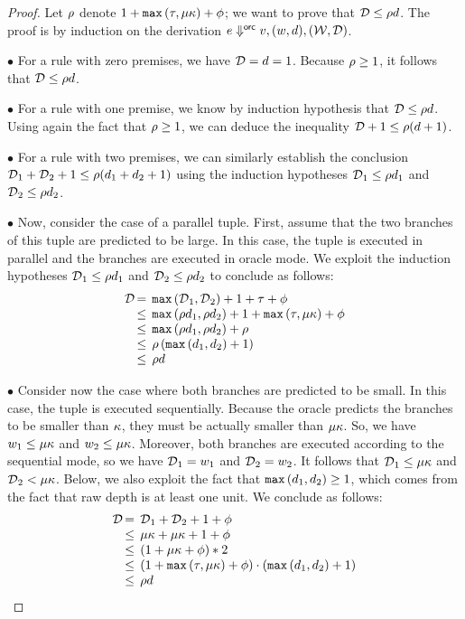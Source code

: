 \begin{proof}


Let $\rho{}$ denote
$1+{\mathtt{{max}}}\left({\tau},{\mu}{\kappa}\right)+{\phi}$; we want to  prove that ${\mathcal{D}} \leq
\rho{}d$.  The proof is by induction on the derivation 
${ e } \Downarrow^{\textsf{orc}} {v}, ({w},{d}), ({{\mathcal{W}}},{{\mathcal{D}}})$.

$\bullet$  For a rule with zero premises, we have ${\mathcal{D}} = d = 1$.
Because $\rho{} \geq 1$, it follows that ${\mathcal{D}} \leq \rho{}d$.

$\bullet$  For a rule with one premise, we know by induction hypothesis that
${\mathcal{D}} \leq \rho{}d$.
Using again the fact that $\rho{} \geq 1$, 
we can deduce the inequality ${\mathcal{D}}+1 \leq \rho{}(d+1)$.

$\bullet$ For a rule with two premises, we can similarly establish
the conclusion ${\mathcal{D}}{}_1+{\mathcal{D}}{}_2+1 \leq \rho{}(d_1+d_2+1)$ using 
the induction hypotheses 
${\mathcal{D}}{}_1 \leq \rho{} d_1$ and ${\mathcal{D}}{}_2 \leq \rho{} d_2$.

$\bullet$  Now, consider the case of a parallel tuple.
First, assume that the two branches of this tuple
are predicted to be large.
In this case, the tuple is executed in parallel and the
branches are executed in oracle mode.
We exploit the induction hypotheses
${\mathcal{D}}{}_1 \leq \rho{} d_1$ and ${\mathcal{D}}{}_2 \leq \rho{} d_2$
to conclude as follows:
%
$$\begin{array}{l@{}l}
\sds & \Sc{=} \kwmax{\sds{}_1}{\sds{}_2} + 1 + \csp + \corc \\
& \Sc\leq \kwmax{ \cspp{}d_1 }{ \cspp{}d_2 } + 1+\kwmax{\csp}{\cerr\coff}+\corc \\
& \Sc\leq \kwmax{ \cspp{}d_1 }{ \cspp{}d_2 } + \cspp{} \\
& \Sc\leq  \cspp{}\, (\kwmax{ d_1 }{ d_2 } + 1) \\
& \Sc{\leq}  \cspp{}\sd
\end{array}$$

$\bullet$  Consider now the case where both branches are predicted
to be small. In this case, the tuple is executed sequentially.
Because the oracle predicts the branches to be smaller
than ${\kappa}$, they must be actually smaller than ${\mu}{\kappa}$.
So, we have $w_1 \leq {\mu}{\kappa}$ and $w_2 \leq {\mu}{\kappa}$.
Moreover, both branches are executed according to the sequential mode,
so we have ${\mathcal{D}}{}_1 = w_1$ and ${\mathcal{D}}{}_2 = w_2$. 
It follows that ${\mathcal{D}}{}_1 \leq {\mu}{\kappa}$ and ${\mathcal{D}}{}_2 < {\mu}{\kappa}$.
Below, we also exploit the fact that 
${\mathtt{{max}}}\left( d_1 , d_2 \right) \geq 1$, which comes from the
fact that raw depth is at least one unit.
We conclude as follows:
%
$$\begin{array}{l@{}l}
\sds & \Sc{=} \sds{}_1 + \sds{}_2 + 1 + \corc \\
& \Sc\leq \cerr\coff + \cerr\coff + 1 + \corc \\
& \Sc\leq  (1+\cerr\coff+\corc)*2 \\
& \Sc\leq  (1+\kwmax{\csp}{\cerr\coff}+\corc)\cdot(\kwmax{ d_1 }{ d_2 } + 1) \\
& \Sc\leq  \cspp{}\sd
\end{array}$$


\end{proof}
